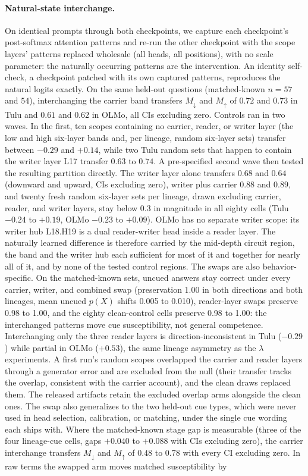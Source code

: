 \documentclass{article}
\begin{document}
\paragraph{Natural-state interchange.} On identical prompts through both checkpoints, we capture each checkpoint's post-softmax attention patterns and re-run the other checkpoint with the scope layers' patterns replaced wholesale (all heads, all positions), with no scale parameter: the naturally occurring patterns are the intervention. An identity self-check, a checkpoint patched with its own captured patterns, reproduces the natural logits exactly. On the same held-out questions (matched-known $n=57$ and $54$), interchanging the carrier band transfers $M_\downarrow$ and $M_\uparrow$ of $0.72$ and $0.73$ in Tulu and $0.61$ and $0.62$ in OLMo, all CIs excluding zero. Controls ran in two waves. In the first, ten scopes containing no carrier, reader, or writer layer (the low and high six-layer bands and, per lineage, random six-layer sets) transfer between $-0.29$ and $+0.14$, while two Tulu random sets that happen to contain the writer layer L17 transfer $0.63$ to $0.74$. A pre-specified second wave then tested the resulting partition directly. The writer layer alone transfers $0.68$ and $0.64$ (downward and upward, CIs excluding zero), writer plus carrier $0.88$ and $0.89$, and twenty fresh random six-layer sets per lineage, drawn excluding carrier, reader, and writer layers, stay below $0.3$ in magnitude in all eighty cells (Tulu $-0.24$ to $+0.19$, OLMo $-0.23$ to $+0.09$). OLMo has no separate writer scope: its writer hub L18.H19 is a dual reader-writer head inside a reader layer. The naturally learned difference is therefore carried by the mid-depth circuit region, the band and the writer hub each sufficient for most of it and together for nearly all of it, and by none of the tested control regions. The swaps are also behavior-specific. On the matched-known sets, uncued answers stay correct under every carrier, writer, and combined swap (preservation 1.00 in both directions and both lineages, mean uncued $p(X)$ shifts 0.005 to 0.010), reader-layer swaps preserve 0.98 to 1.00, and the eighty clean-control cells preserve 0.98 to 1.00: the interchanged patterns move cue susceptibility, not general competence. Interchanging only the three reader layers is direction-inconsistent in Tulu ($-0.29$) while partial in OLMo ($+0.53$), the same lineage asymmetry as the $\lambda$ experiments. A first run's random scopes overlapped the carrier and reader layers through a generator error and are excluded from the null (their transfer tracks the overlap, consistent with the carrier account), and the clean draws replaced them. The released artifacts retain the excluded overlap arms alongside the clean ones. The swap also generalizes to the two held-out cue types, which were never used in head selection, calibration, or matching, under the single cue wording each ships with. Where the matched-known stage gap is measurable (three of the four lineage-cue cells, gaps $+0.040$ to $+0.088$ with CIs excluding zero), the carrier interchange transfers $M_\downarrow$ and $M_\uparrow$ of $0.48$ to $0.78$ with every CI excluding zero. In raw terms the swapped arm moves matched susceptibility by 
\end{document}
